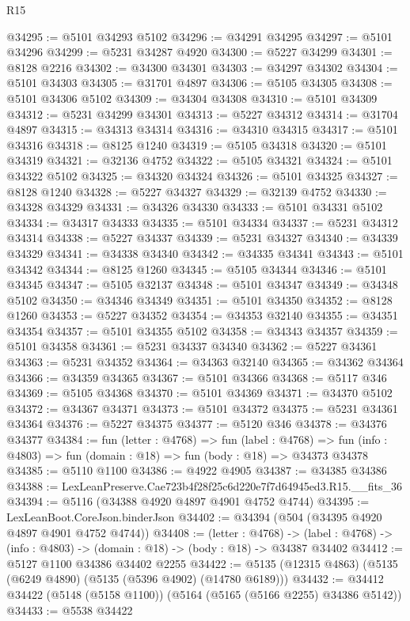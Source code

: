 \begin{lexlean}{R15}
\begin{coremodule}
{{{{{{{{{{{@34295 := @5101 @34293 @5102
@34296 := @34291 @34295
@34297 := @5101 @34296
@34299 := @5231 @34287 @4920
@34300 := @5227 @34299
@34301 := @8128 @2216
@34302 := @34300 @34301
@34303 := @34297 @34302
@34304 := @5101 @34303
@34305 := @31701 @4897
@34306 := @5105 @34305
@34308 := @5101 @34306 @5102
@34309 := @34304 @34308
@34310 := @5101 @34309
@34312 := @5231 @34299 @34301
@34313 := @5227 @34312
@34314 := @31704 @4897
@34315 := @34313 @34314
@34316 := @34310 @34315
@34317 := @5101 @34316
@34318 := @8125 @1240
@34319 := @5105 @34318
@34320 := @5101 @34319
@34321 := @32136 @4752
@34322 := @5105 @34321
@34324 := @5101 @34322 @5102
@34325 := @34320 @34324
@34326 := @5101 @34325
@34327 := @8128 @1240
@34328 := @5227 @34327
@34329 := @32139 @4752
@34330 := @34328 @34329
@34331 := @34326 @34330
@34333 := @5101 @34331 @5102
@34334 := @34317 @34333
@34335 := @5101 @34334
@34337 := @5231 @34312 @34314
@34338 := @5227 @34337
@34339 := @5231 @34327
@34340 := @34339 @34329
@34341 := @34338 @34340
@34342 := @34335 @34341
@34343 := @5101 @34342
@34344 := @8125 @1260
@34345 := @5105 @34344
@34346 := @5101 @34345
@34347 := @5105 @32137
@34348 := @5101 @34347
@34349 := @34348 @5102
@34350 := @34346 @34349
@34351 := @5101 @34350
@34352 := @8128 @1260
@34353 := @5227 @34352
@34354 := @34353 @32140
@34355 := @34351 @34354
@34357 := @5101 @34355 @5102
@34358 := @34343 @34357
@34359 := @5101 @34358
@34361 := @5231 @34337 @34340
@34362 := @5227 @34361
@34363 := @5231 @34352
@34364 := @34363 @32140
@34365 := @34362 @34364
@34366 := @34359 @34365
@34367 := @5101 @34366
@34368 := @5117 @346
@34369 := @5105 @34368
@34370 := @5101 @34369
@34371 := @34370 @5102
@34372 := @34367 @34371
@34373 := @5101 @34372
@34375 := @5231 @34361 @34364
@34376 := @5227 @34375
@34377 := @5120 @346
@34378 := @34376 @34377
@34384 := fun (letter : @4768) =>
  fun (label : @4768) =>
  fun (info : @4803) => fun (domain : @18) => fun (body : @18) => @34373 @34378
@34385 := @5110 @1100
@34386 := @4922 @4905
@34387 := @34385 @34386
@34388 := LexLeanPreserve.Cae723b4f28f25c6d220e7f7d64945ed3.R15.__fits_36
@34394 := @5116 (@34388 @4920 @4897 @4901 @4752 @4744)
@34395 := LexLeanBoot.CoreJson.binderJson
@34402 := @34394 (@504 (@34395 @4920 @4897 @4901 @4752 @4744))
@34408 := (letter : @4768) ->
  (label : @4768) -> (info : @4803) -> (domain : @18) -> (body : @18) -> @34387 @34402
@34412 := @5127 @1100 @34386 @34402 @2255
@34422 := @5135 (@12315 @4863) (@5135 (@6249 @4890) (@5135 (@5396 @4902) (@14780 @6189)))
@34432 := @34412 @34422 (@5148 (@5158 @1100)) (@5164 (@5165 (@5166 @2255) @34386 @5142))
@34433 := @5538 @34422
}}}}}}}}}}}
\end{coremodule}
\end{lexlean}
